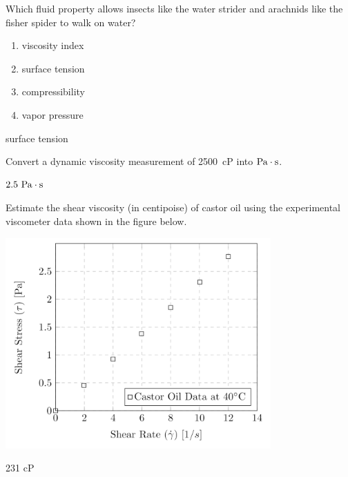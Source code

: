 \documentclass[multi,preview,varwidth=false,border=5,12pt]{standalone}
\begin{document}
\begin{question}

Which fluid property allows insects like the water strider and arachnids like the fisher spider to walk on water?

\begin{enumerate}
  \item viscosity index
  \item surface tension
  \item compressibility
  \item vapor pressure
\end{enumerate}

\begin{solution}
surface tension
\end{solution}

\end{question}


\begin{question}
Convert a dynamic viscosity measurement of 2500~cP into $\mathrm{Pa}\cdot \mathrm{s}$.

\begin{solution}
$2.5~\mathrm{Pa}\cdot \mathrm{s}$
\end{solution}
\end{question}


\begin{question}

 Estimate the shear viscosity (in centipoise) of castor oil using the experimental viscometer data shown in the figure below.

 \includegraphics[width=4in]{imgs/CastorOil.png}

\begin{solution}
231 cP
\end{solution}
\end{question}
\end{document}

